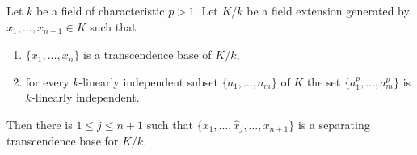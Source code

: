 \begin{lemma}
\label{editorial-source-lemma-mini-separability}
Let $k$ be a field of characteristic $p > 1$. Let $K/k$
be a field extension generated by $x_1, \ldots, x_{n + 1} \in K$ such that
\begin{enumerate}
\item $\{x_1, \ldots, x_n\}$ is a transcendence base of $K/k$,
\item for every $k$-linearly independent subset
$\{a_1, \ldots, a_m\}$ of $K$ the set
$\{a^p_1, \ldots, a_m^p\}$ is $k$-linearly independent.
\end{enumerate}
Then there is $1 \leq j \leq n+1$ such that
$\{ x_1, \ldots, \widehat{x}_j, \ldots, x_{n+1}\}$
is a separating transcendence base for $K / k$.
\end{lemma}

